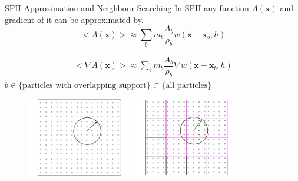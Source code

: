 \documentclass{beamer}
\begin{document}
\begin{frame}{SPH Approximation and Neighbour Searching}
In SPH any function $A(\textbf{x})$ and gradient of it can be approximated by.
\begin{equation}
<A\left(\textbf{x}\right)> \approx \sum_b m_b \dfrac{A_b}{\rho_b} w\left(\textbf{x}-\textbf{x}_b, h\right)
\label{eq:SPH-approximation-sum}
\end{equation}

\begin{equation}
\begin{split}
<\nabla A\left(\textbf{x}\right)> \approx \sum_b m_b \dfrac{A_b}{\rho_b} \nabla w\left(\textbf{x} - \textbf{x}_b, h\right)
\end{split} 
\label{eq:SPH-scalar-function-gradient}
\end{equation}
$b \in \{ \mbox {particles with overlapping support} \} \subset \{ \mbox {all particles}\}$
\begin{figure}
\flushleft
\includegraphics[width=0.415\textwidth]{Neighor-searching-noBG}
\hfill
\includegraphics[width=0.415\textwidth]{Neighbor-Search}
\end{figure}
\end{frame}
\end{document}
